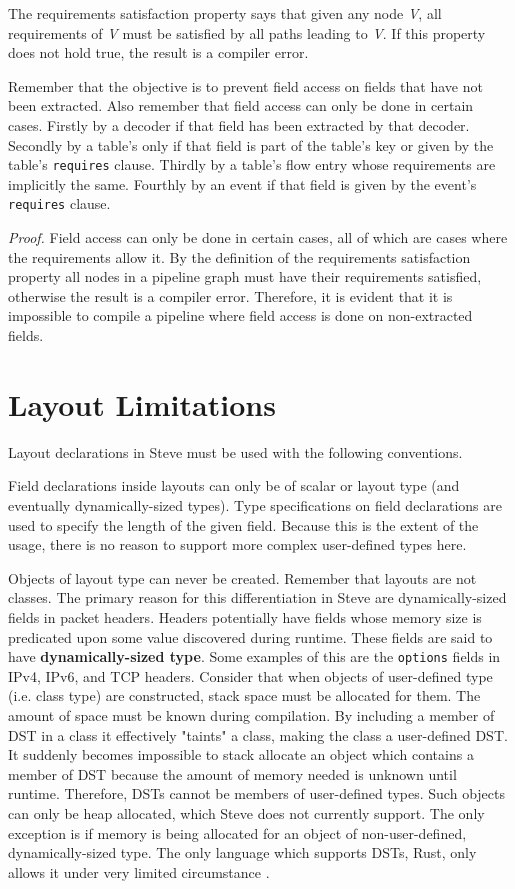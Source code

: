 The requirements satisfaction property says that given any node \textit{V}, all requirements of \textit{V} must be satisfied by all paths leading to \textit{V}. If this property does not hold true, the result is a compiler error.

Remember that the objective is to prevent field access on fields that have not been extracted. Also remember that field access can only be done in certain cases. Firstly by a decoder if that field has been extracted by that decoder. Secondly by a table's only if that field is part of the table's key or given by the table's \texttt{\color{blue}requires} clause. Thirdly by a table's flow entry whose requirements are implicitly the same. Fourthly by an event if that field is given by the event's \texttt{\color{blue}requires} clause.

\textit{Proof.} Field access can only be done in certain cases, all of which are cases where the requirements allow it. By the definition of the requirements satisfaction property all nodes in a pipeline graph must have their requirements satisfied, otherwise the result is a compiler error. Therefore, it is evident that it is impossible to compile a pipeline where field access is done on non-extracted fields.
 
\section{Layout Limitations} \label{layout_guide}

Layout declarations in Steve must be used with the following conventions.

Field declarations inside layouts can only be of scalar or layout type (and eventually dynamically-sized types). Type specifications on field declarations are used to specify the length of the given field. Because this is the extent of the usage, there is no reason to support more complex user-defined types here.

Objects of layout type can never be created. Remember that layouts are not classes. The primary reason for this differentiation in Steve are dynamically-sized fields in packet headers. Headers potentially have fields whose memory size is predicated upon some value discovered during runtime. These fields are said to have \textbf{dynamically-sized type}. Some examples of this are the \texttt{options} fields in IPv4, IPv6, and TCP headers. Consider that when objects of user-defined type (i.e. class type) are constructed, stack space must be allocated for them. The amount of space must be known during compilation. By including a member of DST in a class it effectively "taints" a class, making the class a user-defined DST. It suddenly becomes impossible to stack allocate an object which contains a member of DST because the amount of memory needed is unknown until runtime. Therefore, DSTs cannot be members of user-defined types. Such objects can only be heap allocated, which Steve does not currently support. The only exception is if memory is being allocated for an object of non-user-defined, dynamically-sized type. The only language which supports DSTs, Rust, only allows it under very limited circumstance \cite{rust_dst_std}.

